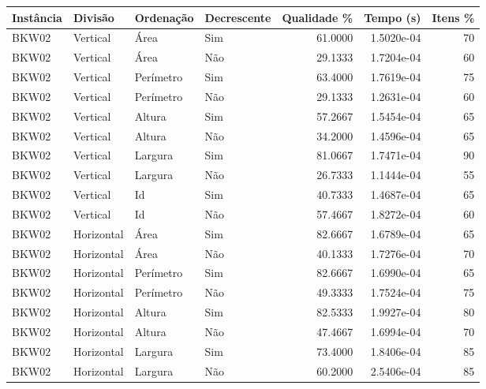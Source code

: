 \begin{tabular}{llllrrr}
    \hline
    Instância & Divisão     & Ordenação & Decrescente & Qualidade \% & Tempo (s)  & Itens \% \\
    \hline
    BKW02     & Vertical    & Área      & Sim         & 61.0000      & 1.5020e-04 & 70       \\
    BKW02     & Vertical    & Área      & Não         & 29.1333      & 1.7204e-04 & 60       \\
    BKW02     & Vertical    & Perímetro & Sim         & 63.4000      & 1.7619e-04 & 75       \\
    BKW02     & Vertical    & Perímetro & Não         & 29.1333      & 1.2631e-04 & 60       \\
    BKW02     & Vertical    & Altura    & Sim         & 57.2667      & 1.5454e-04 & 65       \\
    BKW02     & Vertical    & Altura    & Não         & 34.2000      & 1.4596e-04 & 65       \\
    BKW02     & Vertical    & Largura   & Sim         & 81.0667      & 1.7471e-04 & 90       \\
    BKW02     & Vertical    & Largura   & Não         & 26.7333      & 1.1444e-04 & 55       \\
    BKW02     & Vertical    & Id        & Sim         & 40.7333      & 1.4687e-04 & 65       \\
    BKW02     & Vertical    & Id        & Não         & 57.4667      & 1.8272e-04 & 60       \\
    BKW02     & Horizontal  & Área      & Sim         & 82.6667      & 1.6789e-04 & 65       \\
    BKW02     & Horizontal  & Área      & Não         & 40.1333      & 1.7276e-04 & 70       \\
    BKW02     & Horizontal  & Perímetro & Sim         & 82.6667      & 1.6990e-04 & 65       \\
    BKW02     & Horizontal  & Perímetro & Não         & 49.3333      & 1.7524e-04 & 75       \\
    BKW02     & Horizontal  & Altura    & Sim         & 82.5333      & 1.9927e-04 & 80       \\
    BKW02     & Horizontal  & Altura    & Não         & 47.4667      & 1.6994e-04 & 70       \\
    BKW02     & Horizontal  & Largura   & Sim         & 73.4000      & 1.8406e-04 & 85       \\
    BKW02     & Horizontal  & Largura   & Não         & 60.2000      & 2.5406e-04 & 85       \\

\end{tabular}
